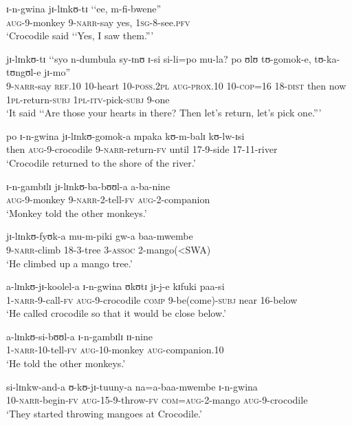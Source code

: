 \begin{exe}
\ex \gll ɪ-n-gwina jɪ-lɪnkʊ-tɪ \lq\lq ee, m-fi-bwene''\\
\textsc{aug}-9-monkey 9-\textsc{narr}-say \phantom{\lq\lq}yes, \textsc{1sg}-8-see.\textsc{pfv}\\
\glt \lq Crocodile said \lq\lq Yes, I saw them.''{}'

\ex \gll jɪ-lɪnkʊ-tɪ \lq\lq syo n-dumbula sy-ɪnʊ ɪ-si si-li=po mu-la? po ʊlʊ tʊ-gomok-e, tʊ-ka-tʊngʊl-e jɪ-mo''\\
9-\textsc{narr}-say \phantom{\lq\lq}\textsc{ref.10} 10-heart 10-\textsc{poss.2pl} \textsc{aug}-\textsc{prox.10} 10-\textsc{cop}=16 18-\textsc{dist} then now \textsc{1pl}-return-\textsc{subj} \textsc{1pl}-\textsc{itv}-pick-\textsc{subj} 9-one\\
\glt \lq It said \lq\lq Are those your hearts in there? Then let's return, let's pick one.''{}'

\ex \gll po ɪ-n-gwina jɪ-lɪnkʊ-gomok-a mpaka kʊ-m-balɪ kʊ-lw-ɪsi\\
then \textsc{aug}-9-crocodile 9-\textsc{narr}-return-\textsc{fv} until 17-9-side 17-11-river\\
\glt \lq Crocodile returned to the shore of the river.'

\ex \gll ɪ-n-gambɪlɪ jɪ-lɪnkʊ-ba-bʊʊl-a a-ba-nine\\
\textsc{aug}-9-monkey 9-\textsc{narr}-2-tell-\textsc{fv} \textsc{aug}-2-companion\\
\glt \lq Monkey told the other monkeys.'

\ex \gll jɪ-lɪnkʊ-fyʊk-a mu-m-piki gw-a baa-mwembe\\
9-\textsc{narr}-climb 18-3-tree 3-\textsc{assoc} 2-mango(<SWA)\\
\glt \lq He climbed up a mango tree.'

\ex \gll a-lɪnkʊ-jɪ-koolel-a ɪ-n-gwina ʊkʊtɪ jɪ-j-e kɪfuki paa-si\\
1-\textsc{narr}-9-call-\textsc{fv} \textsc{aug}-9-crocodile \textsc{comp} 9-be(come)-\textsc{subj} near 16-below\\
\glt \lq He called crocodile so that it would be close below.'

\ex \gll a-lɪnkʊ-si-bʊʊl-a ɪ-n-gambɪlɪ ɪɪ-nine\\
1-\textsc{narr}-10-tell-\textsc{fv} \textsc{aug}-10-monkey \textsc{aug}-companion.10\\
\glt \lq He told the other monkeys.'

\ex \gll si-lɪnkw-and-a ʊ-kʊ-jɪ-tuuny-a na=a-baa-mwembe ɪ-n-gwina\\
10-\textsc{narr}-begin-\textsc{fv} \textsc{aug}-15-9-throw-\textsc{fv} \textsc{com}=\textsc{aug}-2-mango \textsc{aug}-9-crocodile\\
\glt \lq They started throwing mangoes at Crocodile.'


\end{exe}
